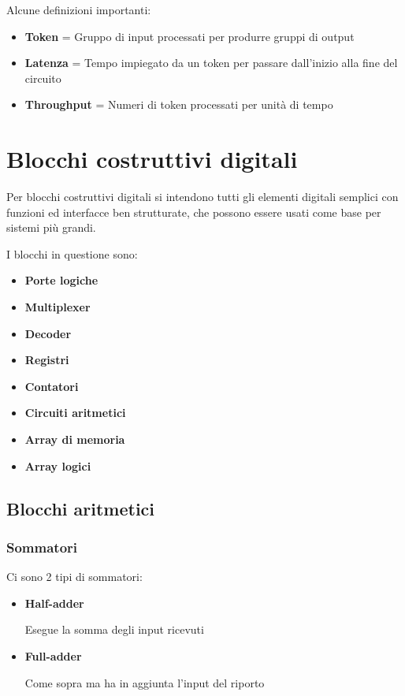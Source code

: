 \documentclass{article}
\begin{document}
Alcune definizioni importanti:
\begin{itemize}
    \item \textbf{Token} = Gruppo di input processati per produrre gruppi di output
    \item \textbf{Latenza} = Tempo impiegato da un token per passare dall'inizio alla fine del circuito
    \item \textbf{Throughput} = Numeri di token processati per unità di tempo
\end{itemize}

\section{Blocchi costruttivi digitali}

Per blocchi costruttivi digitali si intendono tutti gli elementi digitali semplici con funzioni ed interfacce ben strutturate, che possono essere usati come base per sistemi più grandi.\newline

I blocchi in questione sono:
\begin{itemize}
    \item \textbf{Porte logiche}
    \item \textbf{Multiplexer}
    \item \textbf{Decoder}
    \item \textbf{Registri}
    \item \textbf{Contatori}
    \item \textbf{Circuiti aritmetici}
    \item \textbf{Array di memoria}
    \item \textbf{Array logici}
\end{itemize}

\newpage

\subsection{Blocchi aritmetici}

\subsubsection{Sommatori}

Ci sono 2 tipi di sommatori:
\begin{itemize}
    \item \textbf{Half-adder}

        \qquad Esegue la somma degli input ricevuti
    
    \item \textbf{Full-adder}

        \qquad Come sopra ma ha in aggiunta l'input del riporto
    
\end{itemize}
\end{document}
